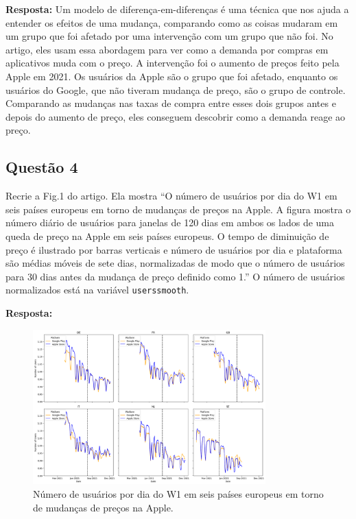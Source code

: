 \textbf{Resposta:} Um modelo de diferença-em-diferenças é uma técnica que nos ajuda a entender os efeitos de uma mudança, comparando como as coisas mudaram em um grupo que foi afetado por uma intervenção com um grupo que não foi. No artigo, eles usam essa abordagem para ver como a demanda por compras em aplicativos muda com o preço. A intervenção foi o aumento de preços feito pela Apple em 2021. Os usuários da Apple são o grupo que foi afetado, enquanto os usuários do Google, que não tiveram mudança de preço, são o grupo de controle. Comparando as mudanças nas taxas de compra entre esses dois grupos antes e depois do aumento de preço, eles conseguem descobrir como a demanda reage ao preço.

\subsection{Questão 4}
Recrie a Fig.1 do artigo. Ela mostra “O número de usuários por dia do W1 em seis países europeus em torno de mudanças de preços na Apple. A figura mostra o número diário de usuários para janelas de 120 dias em ambos os lados de uma queda de preço na Apple em seis países europeus. O tempo de diminuição de preço é ilustrado por barras verticais e número de usuários por dia e plataforma são médias móveis de sete dias, normalizadas de modo que o número de usuários para 30 dias antes da mudança de preço definido como 1.” O número de usuários normalizados está na variável \texttt{userssmooth}.

\textbf{Resposta:} 

\begin{figure}[h!]
    \centering
    \caption{Número de usuários por dia do W1 em seis países europeus em torno de mudanças de preços na Apple.}
    \includegraphics[width=0.8\textwidth]{Textuais/output.png}
\end{figure}

